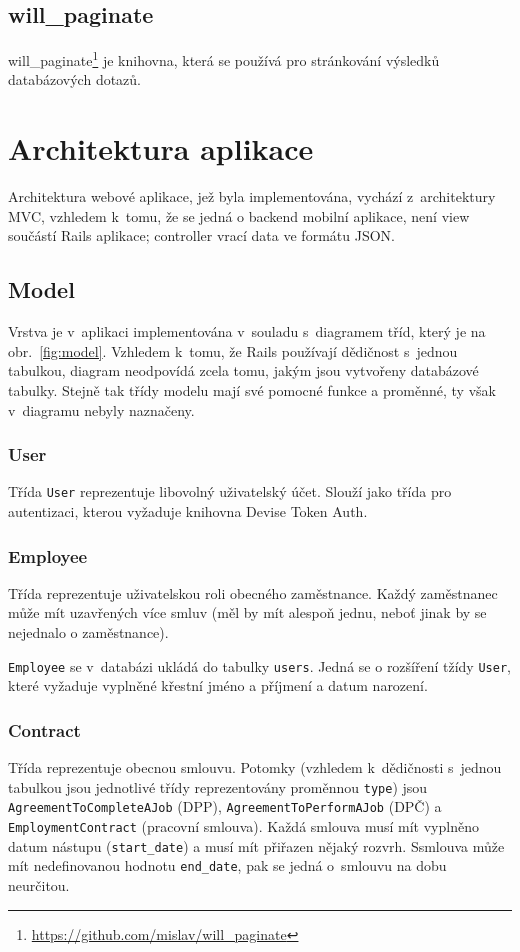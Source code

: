 \documentclass[twoside]{ctuthesis}
\begin{document}
\subsection{will\_paginate}

will\_paginate\footnote{\url{https://github.com/mislav/will_paginate}} je knihovna, která se používá pro stránkování výsledků databázových dotazů.

\section{Architektura aplikace}

Architektura webové aplikace, jež byla implementována, vychází z~ar\-chi\-tek\-tury MVC, vzhledem k~tomu, že se jedná o backend mobilní aplikace, není view součástí Rails aplikace; controller vrací data ve formátu JSON.

\subsection{Model}
Vrstva je v~aplikaci implementována v~souladu s~diagramem tříd, který je na obr.~\ref{fig:model}. Vzhledem k~tomu, že Rails používají dědičnost s~jednou tabulkou, diagram neodpovídá zcela tomu, jakým jsou vytvořeny databázové tabulky. Stejně tak třídy modelu mají své pomocné funkce a proměnné, ty však v~diagramu nebyly naznačeny.

\subsubsection{User}
Třída \texttt{User} reprezentuje libovolný uživatelský účet. Slouží jako třída pro autentizaci, kterou vyžaduje knihovna Devise Token Auth.


\subsubsection{Employee}
Třída reprezentuje uživatelskou roli obecného zaměstnance. Každý zaměstnanec může mít uzavřených více smluv (měl by mít alespoň jednu, neboť jinak by se nejednalo o zaměstnance).

\texttt{Employee} se v~databázi ukládá do tabulky \texttt{users}. Jedná se o rozšíření tžídy \texttt{User}, které vyžaduje vyplněné křestní jméno a příjmení a datum narození.

\subsubsection{Contract}
Třída reprezentuje obecnou smlouvu. Potomky (vzhledem k~dědičnosti s~jed\-nou ta\-bul\-kou jsou jednotlivé třídy reprezentovány proměnnou \texttt{type}) jsou \texttt{AgreementToCompleteAJob} (DPP), \texttt{AgreementToPerformAJob} (DPČ) a \texttt{EmploymentContract} (pracovní smlouva). Každá smlouva musí mít vyplněno datum nástupu (\texttt{start\_date}) a musí mít přiřazen nějaký rozvrh. Ssmlouva může mít nedefinovanou hodnotu \texttt{end\_date}, pak se jedná o~smlouvu na dobu neurčitou.
\end{document}

